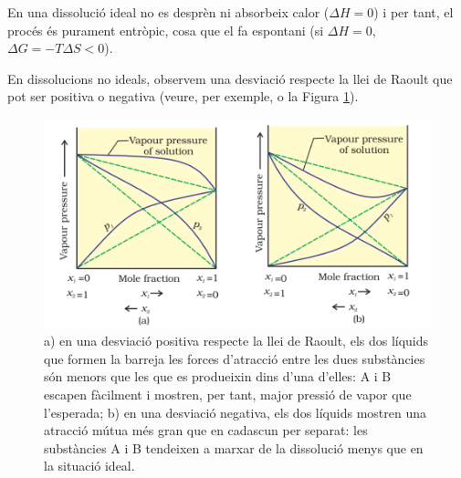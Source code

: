 En una dissolució ideal no es desprèn ni absorbeix calor ($\Delta H=0$) i per tant, el procés és purament entròpic, cosa que el fa espontani (si $\Delta H=0$, $\Delta G= -T \Delta S<0$).

En dissolucions no ideals, observem una desviació respecte la llei de Raoult que pot ser positiva o negativa (veure, per exemple,  o la Figura \ref{fig:desv_raoult}).
\begin{figure}[h]
\centering
\includegraphics[scale=1.0]{figures/desv_raoult.png}
\caption[Llei de Raoult per dissolucions ideals i no ideals]{a) en una desviació positiva respecte la llei de Raoult, els dos líquids que formen la barreja les forces d'atracció entre les dues substàncies són menors que les que es produeixin dins d'una d'elles: A i B escapen fàcilment i mostren, per tant, major pressió de vapor que l'esperada; b) en una desviació negativa, els dos líquids mostren una atracció mútua més gran que en cadascun per separat: les substàncies A i B tendeixen a marxar de la dissolució menys que en la situació ideal.}
\label{fig:desv_raoult}
\end{figure}

